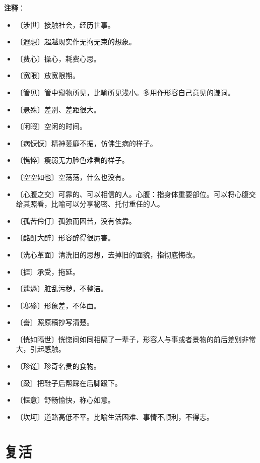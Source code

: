 \documentclass[12pt,UTF-8,openany]{ctexbook}
\begin{document}
\newpage

\textbf{注释}：

\vspace{-1em}

\begin{itemize}
    \setlength\itemsep{-0.2em}
    \item 〔涉世〕接触社会，经历世事。
    \item 〔遐想〕超越现实作无拘无束的想象。
    \item 〔费心〕操心，耗费心思。
    \item 〔宽限〕放宽限期。
    \item 〔管见〕管中窥物所见，比喻所见浅小。多用作形容自己意见的谦词。
    \item 〔悬殊〕差别、差距很大。
    \item 〔闲暇〕空闲的时间。
    \item 〔病恹恹〕精神萎靡不振，仿佛生病的样子。
    \item 〔憔悴〕瘦弱无力脸色难看的样子。
    \item 〔空空如也〕空荡荡，什么也没有。
    \item 〔心腹之交〕可靠的、可以相信的人。心腹：指身体重要部位。可以将心腹交给其照看，比喻可以分享秘密、托付重任的人。
    \item 〔孤苦伶仃〕孤独而困苦，没有依靠。
    \item 〔酩酊大醉〕形容醉得很厉害。
    \item 〔洗心革面〕清洗旧的思想，去掉旧的面貌，指彻底悔改。
    \item 〔捱〕承受，拖延。
    \item 〔邋遢〕脏乱污秽，不整洁。
    \item 〔寒碜〕形象差，不体面。
    \item 〔誊〕照原稿抄写清楚。
    \item 〔恍如隔世〕恍惚间如同相隔了一辈子，形容人与事或者景物的前后差别非常大，引起感触。
    \item 〔珍馐〕珍奇名贵的食物。
    \item 〔趿〕把鞋子后帮踩在后脚跟下。
    \item 〔惬意〕舒畅愉快，称心如意。
    \item 〔坎坷〕道路高低不平。比喻生活困难、事情不顺利，不得志。
\end{itemize}

\chapter{复活}
\end{document}
